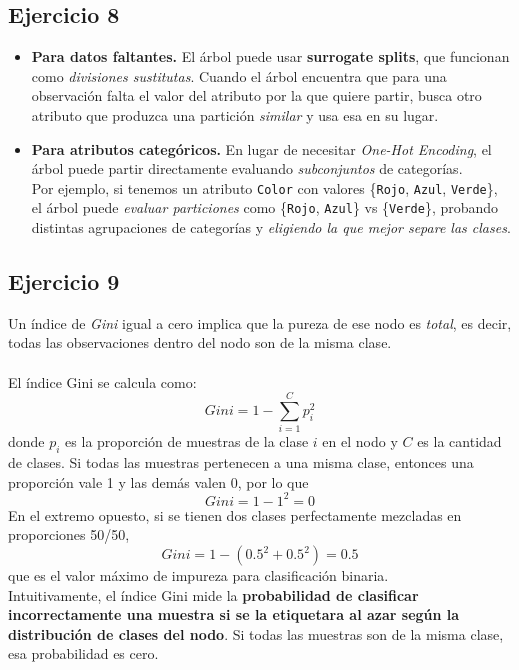 \documentclass[a4paper,12pt]{article}
\begin{document}
        \subsection*{Ejercicio 8}
            \begin{itemize}
                \item \textbf{Para datos faltantes.} El árbol puede usar \textbf{surrogate splits}, que funcionan como \emph{divisiones sustitutas}. Cuando el árbol encuentra que para una observación falta el valor del atributo por la que quiere partir, busca otro atributo que produzca una partición \emph{similar} y usa esa en su lugar.
                \item \textbf{Para atributos categóricos.} En lugar de necesitar \textit{One-Hot Encoding}, el árbol puede partir directamente evaluando \emph{subconjuntos} de categorías. \\
                    Por ejemplo, si tenemos un atributo \texttt{Color} con valores \{\texttt{Rojo}, \texttt{Azul}, \texttt{Verde}\}, el árbol puede \emph{evaluar particiones} como \{\texttt{Rojo}, \texttt{Azul}\} vs \{\texttt{Verde}\}, probando distintas agrupaciones de categorías y \emph{eligiendo la que mejor separe las clases}.
            \end{itemize}
        \subsection*{Ejercicio 9}
            \noindent Un índice de \textit{Gini} igual a cero implica que la pureza de ese nodo es \emph{total}, es decir, todas las observaciones dentro del nodo son de la misma clase. \\
            \\
            \noindent El índice Gini se calcula como: \[ Gini = 1 - \sum_{i=1}^{C} p_{i}^{2} \]
            \noindent donde $p_{i}$ es la proporción de muestras de la clase $i$ en el nodo y $C$ es la cantidad de clases. Si todas las muestras pertenecen a una misma clase, entonces una proporción vale 1 y las demás valen 0, por lo que \[Gini = 1 - 1^2 = 0\] 
            \noindent En el extremo opuesto, si se tienen dos clases perfectamente mezcladas en proporciones 50/50, \[Gini = 1 - (0.5^2 + 0.5^2) = 0.5\]
            \noindent que es el valor máximo de impureza para clasificación binaria. \\
        
            \noindent Intuitivamente, el índice Gini mide la \textbf{probabilidad de clasificar incorrectamente una muestra si se la etiquetara al azar según la distribución de clases del nodo}. Si todas las muestras son de la misma clase, esa probabilidad es cero.
\end{document}
